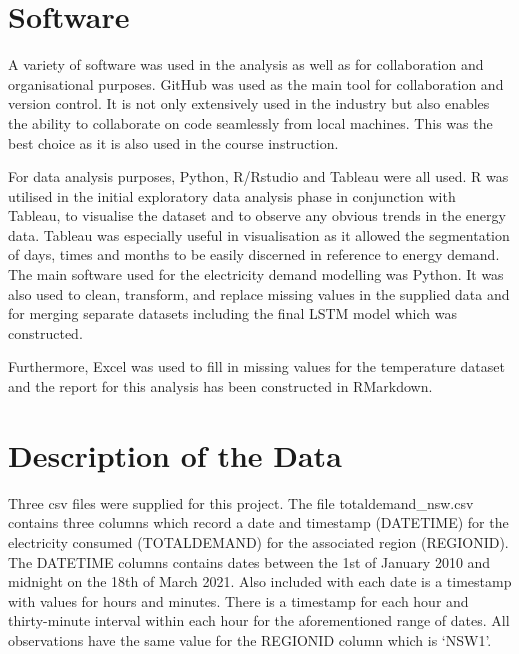 \documentclass[mstat,12pt]{unswthesis}
\begin{document}
\hypertarget{software}{%
\section{Software}\label{software}}

A variety of software was used in the analysis as well as for
collaboration and organisational purposes. GitHub was used as the main
tool for collaboration and version control. It is not only extensively
used in the industry but also enables the ability to collaborate on code
seamlessly from local machines. This was the best choice as it is also
used in the course instruction.

\bigskip

For data analysis purposes, Python, R/Rstudio and Tableau were all used.
R was utilised in the initial exploratory data analysis phase in
conjunction with Tableau, to visualise the dataset and to observe any
obvious trends in the energy data. Tableau was especially useful in
visualisation as it allowed the segmentation of days, times and months
to be easily discerned in reference to energy demand. The main software
used for the electricity demand modelling was Python. It was also used
to clean, transform, and replace missing values in the supplied data and
for merging separate datasets including the final LSTM model which was
constructed.

\bigskip

Furthermore, Excel was used to fill in missing values for the
temperature dataset and the report for this analysis has been
constructed in RMarkdown.

\hypertarget{description-of-the-data}{%
\section{Description of the Data}\label{description-of-the-data}}

Three csv files were supplied for this project. The file
totaldemand\_nsw.csv contains three columns which record a date and
timestamp (DATETIME) for the electricity consumed (TOTALDEMAND) for the
associated region (REGIONID). The DATETIME columns contains dates
between the 1st of January 2010 and midnight on the 18th of March 2021.
Also included with each date is a timestamp with values for hours and
minutes. There is a timestamp for each hour and thirty-minute interval
within each hour for the aforementioned range of dates. All observations
have the same value for the REGIONID column which is `NSW1'.
\end{document}
